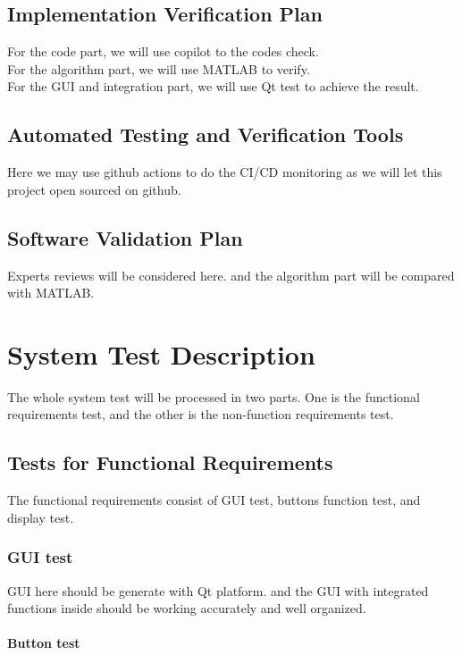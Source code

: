 \documentclass[12pt, titlepage]{article}
\begin{document}
\subsection{Implementation Verification Plan}

For the code part, we will use copilot to the codes check.\\
For the algorithm part, we will use MATLAB to verify.\\
For the GUI and integration part, we will use Qt test to achieve the result.\\


\subsection{Automated Testing and Verification Tools}

Here we may use github actions to do the CI/CD monitoring as we will let this project open sourced on github.


\subsection{Software Validation Plan}
   Experts reviews will be considered here. and the algorithm part will be compared with MATLAB.

\section{System Test Description}
The whole system test will be processed in two parts. One is the functional requirements test, and the other is the non-function requirements test.\\
	
\subsection{Tests for Functional Requirements}
The functional requirements consist of GUI test, buttons function test, and display test.
\subsubsection{GUI test}

GUI here should be generate with Qt platform. and the GUI with integrated functions inside should be working accurately and well organized.
		
\paragraph{ Button test}
\end{document}
